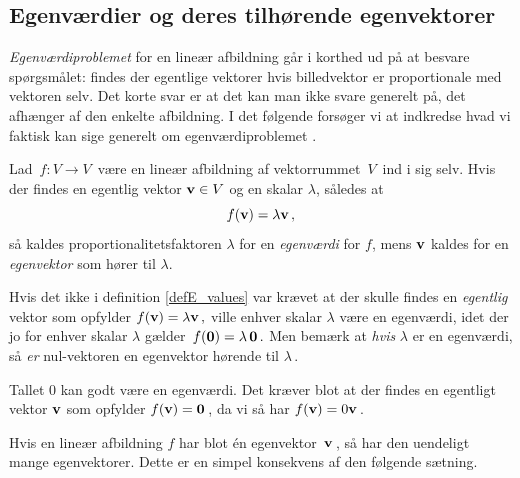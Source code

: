 \subsection{Egenværdier og deres tilhørende egenvektorer}

\textit{Egenværdiproblemet} for en lineær afbildning går i korthed ud på at besvare spørgsmålet: findes der egentlige vektorer hvis billedvektor er proportionale med vektoren selv. Det korte svar er at det kan man ikke svare generelt på, det afhænger af den enkelte afbildning. I det følgende forsøger vi at indkredse hvad vi faktisk kan sige generelt om egenværdiproblemet .

\begin{definition}\label{defE_values}
Lad $\,f:V\rightarrow V\,$ være en lineær afbildning af vektorrummet $\,V\,$ ind i sig selv. Hvis der findes en egentlig vektor $\mathbf{v}\in V$ og en skalar $\lambda$, således at
\begin{equation}\label{egenvektor2}
f(\mathbf{v})=\lambda\mathbf{v}\,,
\end{equation}
så kaldes proportionalitetsfaktoren $\lambda$ for en \textit{egenværdi} for $f$, mens $\mathbf{v}$ kaldes for en \textit{egenvektor} som hører til $\lambda$.
\end{definition}

\begin{aha}
Hvis det ikke i definition \ref{defE_values} var krævet at der skulle findes en \textit{egentlig} vektor som opfylder $f(\mathbf{v})=\lambda\mathbf{v}\,,$ ville enhver skalar $\lambda$ være en egenværdi, idet der jo for enhver skalar $\lambda$ gælder $\,f(\bm{0})=\lambda\,\bm{0}\,.$  Men bemærk at \textit{hvis} $\lambda$ er en egenværdi, så \textit{er} nul-vektoren en egenvektor hørende til $\lambda\,$.
\end{aha}

\begin{aha}
Tallet $0$ kan godt være en egenværdi. Det kræver blot at der findes en egentligt vektor $\mathbf{v}$ som opfylder $f(\mathbf{v})=\bm{0}\,$, da vi så har $f(\mathbf{v})=0\mathbf{v}\,$.
\end{aha}

Hvis en lineær afbildning $f$ har blot én egenvektor $\,\mathbf{v}\,$, så har den uendeligt mange egenvektorer. Dette er en simpel konsekvens af den følgende sætning. 

